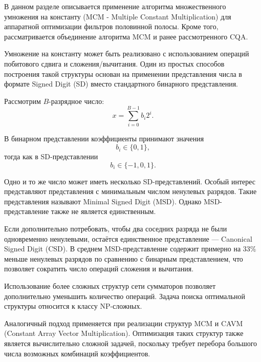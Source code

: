 В данном разделе описывается применение алгоритма множественного умножения на константу (MCM - Multiple Constant Multiplication) для аппаратной оптимизации фильтров половинной полосы. Кроме того, рассматривается объединение алгоритма MCM и ранее рассмотренного CQA.

Умножение на константу может быть реализовано с использованием операций побитового сдвига и сложения/вычитания. Один из простых способов построения такой структуры основан на применении представления числа в формате Signed Digit (SD) вместо стандартного бинарного представления.

Рассмотрим $B$-разрядное число:
\begin{equation}
	x = \sum_{i=0}^{B-1} b_i 2^i.
\end{equation}

В бинарном представлении коэффициенты принимают значения
\begin{equation}
	b_i \in \{0,1\},
\end{equation}
тогда как в SD-представлении
\begin{equation}
	b_i \in \{-1,0,1\}.
\end{equation}

Одно и то же число может иметь несколько SD-представлений. Особый интерес представляют представления с минимальным числом ненулевых разрядов. Такие представления называют Minimal Signed Digit (MSD). Однако MSD-представление также не является единственным.

Если дополнительно потребовать, чтобы два соседних разряда не были одновременно ненулевыми, остаётся единственное представление — Canonical Signed Digit (CSD). В среднем MSD-представление содержит примерно на $33\%$ меньше ненулевых разрядов по сравнению с бинарным представлением, что позволяет сократить число операций сложения и вычитания.

Использование более сложных структур сети сумматоров позволяет дополнительно уменьшить количество операций. Задача поиска оптимальной структуры относится к классу NP-сложных.

Аналогичный подход применяется при реализации структур MCM и CAVM (Constant Array Vector Multiplication). Оптимизация таких структур также является вычислительно сложной задачей, поскольку требует перебора большого числа возможных комбинаций коэффициентов.

